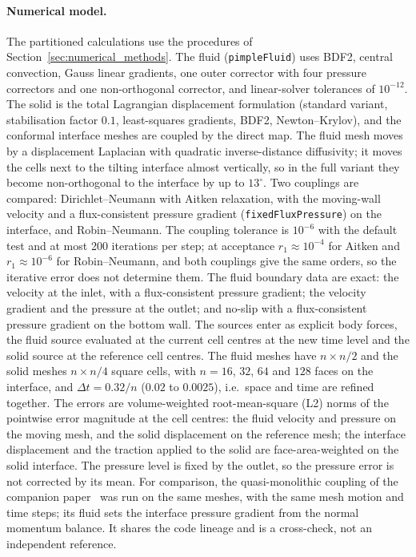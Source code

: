 \paragraph{Numerical model.}
The partitioned calculations use the procedures of Section~\ref{sec:numerical_methods}.
The fluid (\texttt{pimpleFluid}) uses BDF2, central convection, Gauss linear gradients, one outer corrector with four pressure correctors and one non-orthogonal corrector, and linear-solver tolerances of $10^{-12}$.
The solid is the total Lagrangian displacement formulation (standard variant, stabilisation factor $0.1$, least-squares gradients, BDF2, Newton--Krylov), and the conformal interface meshes are coupled by the direct map.
The fluid mesh moves by a displacement Laplacian with quadratic inverse-distance diffusivity; it moves the cells next to the tilting interface almost vertically, so in the full variant they become non-orthogonal to the interface by up to $13^\circ$.
Two couplings are compared: Dirichlet--Neumann with Aitken relaxation, with the moving-wall velocity and a flux-consistent pressure gradient (\texttt{fixedFluxPressure}) on the interface, and Robin--Neumann.
The coupling tolerance is $10^{-6}$ with the default test and at most 200 iterations per step; at acceptance $r_1 \approx 10^{-4}$ for Aitken and $r_1 \approx 10^{-6}$ for Robin--Neumann, and both couplings give the same orders, so the iterative error does not determine them.
The fluid boundary data are exact: the velocity at the inlet, with a flux-consistent pressure gradient; the velocity gradient and the pressure at the outlet; and no-slip with a flux-consistent pressure gradient on the bottom wall.
The sources enter as explicit body forces, the fluid source evaluated at the current cell centres at the new time level and the solid source at the reference cell centres.
The fluid meshes have $n \times n/2$ and the solid meshes $n \times n/4$ square cells, with $n = 16$, $32$, $64$ and $128$ faces on the interface, and $\Delta t = 0.32/n$ ($0.02$ to $0.0025$), i.e.\ space and time are refined together.
The errors are volume-weighted root-mean-square (L2) norms of the pointwise error magnitude at the cell centres: the fluid velocity and pressure on the moving mesh, and the solid displacement on the reference mesh; the interface displacement and the traction applied to the solid are face-area-weighted on the solid interface.
The pressure level is fixed by the outlet, so the pressure error is not corrected by its mean.
For comparison, the quasi-monolithic coupling of the companion paper~\citep{CardiffBatistic2026QM} was run on the same meshes, with the same mesh motion and time steps; its fluid sets the interface pressure gradient from the normal momentum balance. It shares the code lineage and is a cross-check, not an independent reference.

